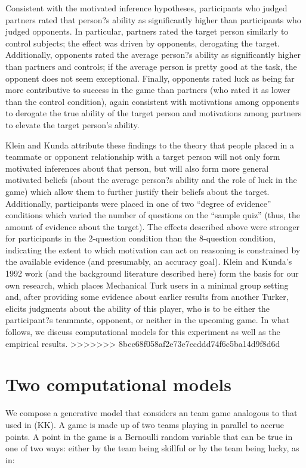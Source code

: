 \documentclass{article}
\begin{document}
Consistent with the motivated inference hypotheses, participants who judged partners rated that person?s ability as significantly higher than participants who judged opponents. In particular, partners rated the target person similarly to control subjects; the effect was driven by opponents, derogating the target. Additionally, opponents rated the average person?s ability as significantly higher than partners and controls; if the average person is pretty good at the task, the opponent does not seem exceptional. Finally, opponents rated luck as being far more contributive to success in the game than partners (who rated it as lower than the control condition), again consistent with motivations among opponents to derogate the true ability of the target person and motivations among partners to elevate the target person's ability.  

Klein and Kunda attribute these findings to the theory that people placed in a teammate or opponent relationship with a target person will not only form motivated inferences about that person, but will also form more general motivated beliefs (about the average person?s ability and the role of luck in the game) which allow them to further justify their beliefs about the target. Additionally, participants were placed in one of two ``degree of evidence'' conditions which varied the number of questions on the ``sample quiz'' (thus, the amount of evidence about the target). The effects described above were stronger for participants in the 2-question condition than the 8-question condition, indicating the extent to which motivation can act on reasoning is constrained by the available evidence (and presumably, an accuracy goal). Klein and Kunda's 1992 work (and the background literature described here) form the basis for our own research, which places Mechanical Turk users in a minimal group setting and, after providing some evidence about earlier results from another Turker, elicits judgments about the ability of this player, who is to be either the participant?s teammate, opponent, or neither in the upcoming game. In what follows, we discuss computational models for this experiment as well as the empirical results.
>>>>>>> 8bcc68f058af2e73e7ccddd74f6c5ba14d9f8d6d

\section{Two computational models}

We compose a generative model that considers an team game analogous to that used in \citet{Klein1992} (KK). A game is made up of two teams playing in parallel to accrue points. A point in the game is a Bernoulli random variable that can be true in one of two ways: either by the team being skillful or by the team being lucky, as in:
\end{document}
